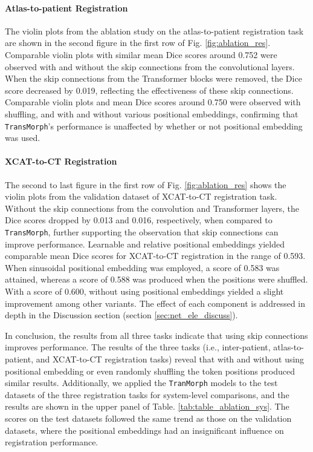 \documentclass[times,twocolumn,final]{elsarticle}
\begin{document}
\paragraph{Atlas-to-patient Registration} The violin plots from the ablation study on the atlas-to-patient registration task are shown in the second figure in the first row of Fig. \ref{fig:ablation_res}. Comparable violin plots with similar mean Dice scores around 0.752 were observed with and without the skip connections from the convolutional layers. When the skip connections from the Transformer blocks were removed, the Dice score decreased by 0.019, reflecting the effectiveness of these skip connections. Comparable violin plots and mean Dice scores around 0.750 were observed with shuffling, and with and without various positional embeddings, confirming that \texttt{TransMorph}'s performance is unaffected by whether or not positional embedding was used.

\paragraph{XCAT-to-CT Registration} The second to last figure in the first row of Fig. \ref{fig:ablation_res} shows the violin plots from the validation dataset of XCAT-to-CT registration task. Without the skip connections from the convolution and Transformer layers, the Dice scores dropped by 0.013 and 0.016, respectively, when compared to \texttt{TransMorph}, further supporting the observation that skip connections can improve performance. Learnable and relative positional embeddings yielded comparable mean Dice scores for XCAT-to-CT registration in the range of 0.593. When sinusoidal positional embedding was employed, a score of 0.583 was attained, whereas a score of 0.588 was produced when the positions were shuffled. With a score of 0.600, without using positional embeddings yielded a slight improvement among other variants. The effect of each component is addressed in depth in the Discussion section (section \ref{sec:net_ele_discuss}).

In conclusion, the results from all three tasks indicate that using skip connections improves performance. The results of the three tasks (i.e., inter-patient, atlas-to-patient, and XCAT-to-CT registration tasks) reveal that with and without using positional embedding or even randomly shuffling the token positions produced similar results. Additionally, we applied the \texttt{TranMorph} models to the test datasets of the three registration tasks for system-level comparisons, and the results are shown in the upper panel of Table. \ref{tab:table_ablation_sys}. The scores on the test datasets followed the same trend as those on the validation datasets, where the positional embeddings had an insignificant influence on registration performance.
\end{document}
